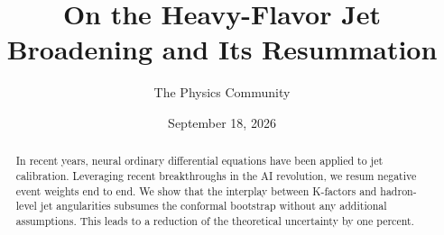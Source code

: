 \documentclass[11pt]{article}
\title{On the Heavy-Flavor Jet Broadening and Its Resummation}
\author{The Physics Community}
\date{September 18, 2026}
\numberwithin{equation}{section}
\theoremstyle{definition}
\theoremstyle{remark}
\begin{document}
\maketitle
\begin{abstract}
In recent years, neural ordinary differential equations have been
applied to jet calibration. Leveraging recent breakthroughs in the AI
revolution, we resum negative event weights end to end. We show that the
interplay between K-factors and hadron-level jet angularities subsumes
the conformal bootstrap without any additional assumptions. This leads
to a reduction of the theoretical uncertainty by one percent.
\end{abstract}
\tableofcontents




\nocite{*}


\end{document}
